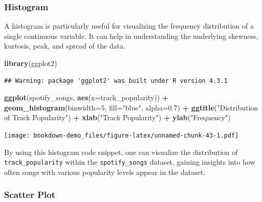 \documentclass[
  b5paper]{book}
\newenvironment{Shaded}{\begin{snugshade}}{\end{snugshade}}
\newcommand{\AttributeTok}[1]{\textcolor[rgb]{0.13,0.29,0.53}{#1}}
\newcommand{\DecValTok}[1]{\textcolor[rgb]{0.00,0.00,0.81}{#1}}
\newcommand{\FloatTok}[1]{\textcolor[rgb]{0.00,0.00,0.81}{#1}}
\newcommand{\FunctionTok}[1]{\textcolor[rgb]{0.13,0.29,0.53}{\textbf{#1}}}
\newcommand{\NormalTok}[1]{#1}
\newcommand{\SpecialCharTok}[1]{\textcolor[rgb]{0.81,0.36,0.00}{\textbf{#1}}}
\newcommand{\StringTok}[1]{\textcolor[rgb]{0.31,0.60,0.02}{#1}}
\begin{document}
\hypertarget{histogram}{%
\subsubsection{Histogram}\label{histogram}}

A histogram is particularly useful for visualizing the frequency distribution of a single continuous variable. It can help in understanding the underlying skewness, kurtosis, peak, and spread of the data.

\begin{Shaded}
\begin{Highlighting}[]
  \FunctionTok{library}\NormalTok{(ggplot2)}
\end{Highlighting}
\end{Shaded}

\begin{verbatim}
## Warning: package 'ggplot2' was built under R version 4.3.1
\end{verbatim}

\begin{Shaded}
\begin{Highlighting}[]
  \FunctionTok{ggplot}\NormalTok{(spotify\_songs, }\FunctionTok{aes}\NormalTok{(}\AttributeTok{x=}\NormalTok{track\_popularity)) }\SpecialCharTok{+}
    \FunctionTok{geom\_histogram}\NormalTok{(}\AttributeTok{binwidth=}\DecValTok{5}\NormalTok{, }\AttributeTok{fill=}\StringTok{"blue"}\NormalTok{, }\AttributeTok{alpha=}\FloatTok{0.7}\NormalTok{) }\SpecialCharTok{+}
    \FunctionTok{ggtitle}\NormalTok{(}\StringTok{"Distribution of Track Popularity"}\NormalTok{) }\SpecialCharTok{+}
    \FunctionTok{xlab}\NormalTok{(}\StringTok{"Track Popularity"}\NormalTok{) }\SpecialCharTok{+}
    \FunctionTok{ylab}\NormalTok{(}\StringTok{"Frequency"}\NormalTok{)}
\end{Highlighting}
\end{Shaded}

\texttt{[image: bookdown-demo\_files/figure-latex/unnamed-chunk-43-1.pdf]}

By using this histogram code snippet, one can visualize the distribution of \texttt{track\_popularity} within the \texttt{spotify\_songs} dataset, gaining insights into how often songs with various popularity levels appear in the dataset.

\hypertarget{scatter-plot}{%
\subsubsection{Scatter Plot}\label{scatter-plot}}
\end{document}
